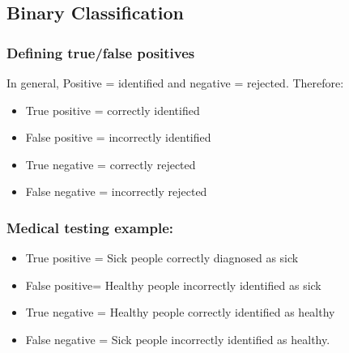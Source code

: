 \documentclass[caret-main.tex]{subfiles}
\begin{document}
\subsection*{Binary Classification}
\subsubsection*{Defining true/false positives}
In general, Positive = identified and negative = rejected. Therefore:

\begin{itemize}
\item True positive = correctly identified

\item False positive = incorrectly identified

\item True negative = correctly rejected

\item False negative = incorrectly rejected
\end{itemize}
\subsubsection*{Medical testing example:}
\begin{itemize}
\item True positive = Sick people correctly diagnosed as sick

\item False positive= Healthy people incorrectly identified as sick

\item True negative = Healthy people correctly identified as healthy

\item False negative = Sick people incorrectly identified as healthy.
\end{itemize}
\newpage
\end{document}
